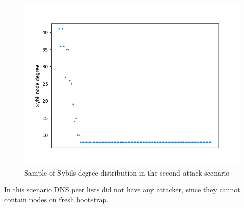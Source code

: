 \begin{figure}[h!]
	\includegraphics[width=.7\textwidth]{pict/results/ex-atk-dd.png}
	\centering
	\caption{Sample of Sybils degree distribution in the second attack scenario}
	\label{fig:dd}
\end{figure}

In this scenario DNS peer lists did not have any attacker, since they cannot contain nodes on fresh bootstrap.
